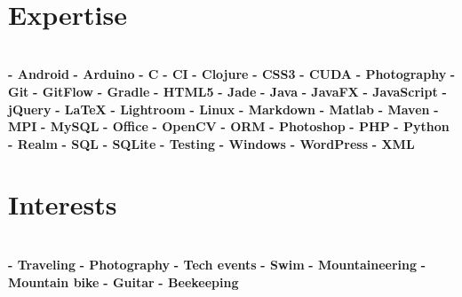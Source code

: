 \documentclass[]{friggeri-cv}
\begin{document}
\begin{aside}
~
~
~
  \section{\vspace{0.49cm}Expertise}
    \\[0.3cm]
    \textbf{- Android}
    \textbf{- Arduino}
    \textbf{- C}
    \textbf{- CI}    
    \textbf{- Clojure}
    \textbf{- CSS3}
    \textbf{- CUDA}
    \textbf{- Photography}
    \textbf{- Git}
    \textbf{- GitFlow}    
    \textbf{- Gradle}
    \textbf{- HTML5}
    \textbf{- Jade}
    \textbf{- Java}
    \textbf{- JavaFX}
    \textbf{- JavaScript}
    \textbf{- jQuery}
    \textbf{- \LaTeX}
    \textbf{- Lightroom}
    \textbf{- Linux}
    \textbf{- Markdown}
    \textbf{- Matlab}
    \textbf{- Maven}
    \textbf{- MPI}
    \textbf{- MySQL}
    \textbf{- Office}
    \textbf{- OpenCV}
    \textbf{- ORM}
    \textbf{- Photoshop}
    \textbf{- PHP}
    \textbf{- Python}
    \textbf{- Realm}
    \textbf{- SQL}
    \textbf{- SQLite}    
    \textbf{- Testing}
    \textbf{- Windows}
    \textbf{- WordPress}
    \textbf{- XML}
    ~
  \section{Interests}
    \\[0.3cm]  
    \textbf{- Traveling}
    \textbf{- Photography}
    \textbf{- Tech events}    
    \textbf{- Swim}
    \textbf{- Mountaineering}
    \textbf{- Mountain bike}
    \textbf{- Guitar}    
    \textbf{- Beekeeping}
    ~
\end{aside}
\end{document}
